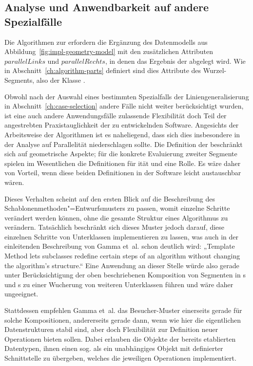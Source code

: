 \documentclass[../main/thesis.tex]{subfiles}
\begin{document}
\subsection{Analyse und Anwendbarkeit auf andere Spezialfälle}
\label{ch:impl-analyser}

Die Algorithmen zur  erfordern die Ergänzung des Datenmodells aus Abbildung~\ref{fig:impl-geometry-model} mit den zusätzlichen Attributen $parallelLinks$ und $parallelRechts$, in denen das Ergebnis der  abgelegt wird.
Wie in Abschnitt~\ref{ch:algorithm-parts} definiert sind dies Attribute des Wurzel-Segments, also der Klasse .

Obwohl nach der Auswahl eines bestimmten Spezialfalls der Liniengeneralisierung in Abschnitt~\ref{ch:case-selection} andere Fälle nicht weiter berücksichtigt wurden, ist eine auch andere Anwendungsfälle zulassende Flexibilität doch Teil der angestrebten Praxistauglichkeit der zu entwickelnden Software.
Angesichts der Arbeitsweise der Algorithmen ist es naheliegend, dass sich dies insbesondere in der Analyse auf Parallelität niederschlagen sollte.
Die Definition der  beschränkt sich auf geometrische Aspekte; für die konkrete Evaluierung zweiter Segmente spielen im Wesentlichen die Definitionen für ität und  eine Rolle.
Es wäre daher von Vorteil, wenn diese beiden Definitionen in der Software leicht austauschbar wären.

Dieses Verhalten scheint auf den ersten Blick auf die Beschreibung des Schablonenmethoden"=Entwurfsmusters  zu passen, womit einzelne Schritte verändert werden können, ohne die gesamte Struktur eines Algorithmus zu verändern.
Tatsächlich beschränkt sich dieses Muster jedoch darauf, diese einzelnen Schritte von Unterklassen implementieren zu lassen, was auch in der einleitenden Beschreibung von Gamma et~al. schon deutlich wird:
„Template Method lets subclasses redefine certain steps of an algorithm without changing the algorithm's structure.“ 
Eine Anwendung an dieser Stelle würde also gerade unter Berücksichtigung der oben beschriebenen Komposition von Segmenten in s und s zu einer Wucherung von weiteren Unterklassen führen und wäre daher ungeeignet.

Stattdessen empfehlen Gamma et~al. das Besucher-Muster  einerseits gerade für solche Kompositionen, andererseits gerade dann, wenn wie hier die eigentlichen Datenstrukturen stabil sind, aber doch Flexibilität zur Definition neuer Operationen bieten sollen. 
Dabei erlauben die Objekte der bereits etablierten Datentypen, ihnen einen sog.  als ein unabhängiges Objekt mit definierter Schnittstelle zu übergeben, welches die jeweiligen Operationen implementiert. 
\end{document}

